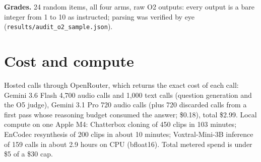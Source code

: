 \textbf{Grades.} 24 random items, all four arms, raw O2 outputs: every output is a bare integer from 1 to 10 as instructed; parsing was verified by eye (\texttt{results/audit\_o2\_sample.json}).

\section{Cost and compute}
\label{app:cost}

Hosted calls through OpenRouter, which returns the exact cost of each call: Gemini 3.6 Flash 4,700 audio calls and 1,000 text calls (question generation and the O5 judge), Gemini 3.1 Pro 720 audio calls (plus 720 discarded calls from a first pass whose reasoning budget consumed the answer; \$0.18), total \$2.99. Local compute on one Apple M4: Chatterbox cloning of 450 clips in 103 minutes; EnCodec resynthesis of 200 clips in about 10 minutes; Voxtral-Mini-3B inference of 159 calls in about 2.9 hours on CPU (bfloat16). Total metered spend is under \$5 of a \$30 cap.
